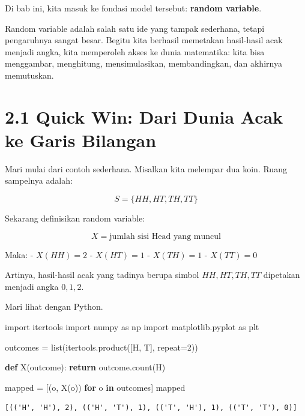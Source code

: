 \documentclass[
  letterpaper,
  DIV=11,
  numbers=noendperiod]{scrreprt}
\newenvironment{Shaded}{\begin{snugshade}}{\end{snugshade}}
\newcommand{\BuiltInTok}[1]{\textcolor[rgb]{0.00,0.23,0.31}{#1}}
\newcommand{\ControlFlowTok}[1]{\textcolor[rgb]{0.00,0.23,0.31}{\textbf{#1}}}
\newcommand{\DecValTok}[1]{\textcolor[rgb]{0.68,0.00,0.00}{#1}}
\newcommand{\ImportTok}[1]{\textcolor[rgb]{0.00,0.46,0.62}{#1}}
\newcommand{\KeywordTok}[1]{\textcolor[rgb]{0.00,0.23,0.31}{\textbf{#1}}}
\newcommand{\NormalTok}[1]{\textcolor[rgb]{0.00,0.23,0.31}{#1}}
\newcommand{\OperatorTok}[1]{\textcolor[rgb]{0.37,0.37,0.37}{#1}}
\newcommand{\StringTok}[1]{\textcolor[rgb]{0.13,0.47,0.30}{#1}}
\begin{document}
Di bab ini, kita masuk ke fondasi model tersebut: \textbf{random
variable}.

Random variable adalah salah satu ide yang tampak sederhana, tetapi
pengaruhnya sangat besar. Begitu kita berhasil memetakan hasil-hasil
acak menjadi angka, kita memperoleh akses ke dunia matematika: kita bisa
menggambar, menghitung, mensimulasikan, membandingkan, dan akhirnya
memutuskan.

\section{2.1 Quick Win: Dari Dunia Acak ke Garis
Bilangan}\label{quick-win-dari-dunia-acak-ke-garis-bilangan}

Mari mulai dari contoh sederhana. Misalkan kita melempar dua koin. Ruang
sampelnya adalah:

\[
S = \{HH, HT, TH, TT\}
\]

Sekarang definisikan random variable:

\[
X = \text{jumlah sisi Head yang muncul}
\]

Maka: - \(X(HH)=2\) - \(X(HT)=1\) - \(X(TH)=1\) - \(X(TT)=0\)

Artinya, hasil-hasil acak yang tadinya berupa simbol \(HH, HT, TH, TT\)
dipetakan menjadi angka \(0,1,2\).

Mari lihat dengan Python.

\begin{Shaded}
\begin{Highlighting}[]
\ImportTok{import}\NormalTok{ itertools}
\ImportTok{import}\NormalTok{ numpy }\ImportTok{as}\NormalTok{ np}
\ImportTok{import}\NormalTok{ matplotlib.pyplot }\ImportTok{as}\NormalTok{ plt}

\NormalTok{outcomes }\OperatorTok{=} \BuiltInTok{list}\NormalTok{(itertools.product([}\StringTok{\textquotesingle{}H\textquotesingle{}}\NormalTok{, }\StringTok{\textquotesingle{}T\textquotesingle{}}\NormalTok{], repeat}\OperatorTok{=}\DecValTok{2}\NormalTok{))}

\KeywordTok{def}\NormalTok{ X(outcome):}
    \ControlFlowTok{return}\NormalTok{ outcome.count(}\StringTok{\textquotesingle{}H\textquotesingle{}}\NormalTok{)}

\NormalTok{mapped }\OperatorTok{=}\NormalTok{ [(o, X(o)) }\ControlFlowTok{for}\NormalTok{ o }\KeywordTok{in}\NormalTok{ outcomes]}
\NormalTok{mapped}
\end{Highlighting}
\end{Shaded}

\begin{verbatim}
[(('H', 'H'), 2), (('H', 'T'), 1), (('T', 'H'), 1), (('T', 'T'), 0)]
\end{verbatim}
\end{document}
